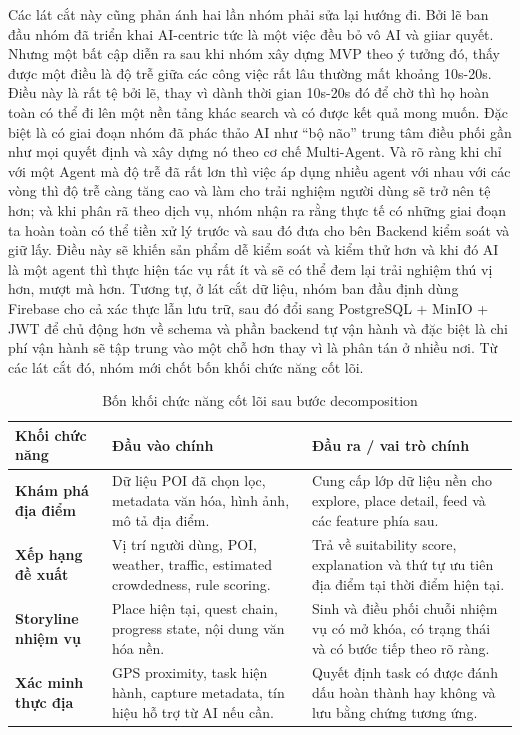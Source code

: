 Các lát cắt này cũng phản ánh hai lần nhóm phải sửa lại hướng đi. Bởi lẽ ban đầu nhóm đã triển khai
AI-centric tức là một việc đều bỏ vô AI và giiar quyết. Nhưng một bất cập diễn ra sau khi nhóm xây dựng MVP theo ý tưởng đó, thấy được một điều 
là độ trễ giữa các công việc rất lâu thường mất khoảng 10s-20s. Điều này là rất tệ bởi lẽ, thay vì dành thời gian 10s-20s đó để chờ
thì họ hoàn toàn có thể đi lên một nền tảng khác search và có được kết quả mong muốn. Đặc biệt là có giai đoạn nhóm đã 
phác thảo AI như ``bộ não'' trung tâm điều phối gần như mọi
quyết định và xây dựng nó theo cơ chế Multi-Agent. Và rõ ràng khi chỉ với một Agent mà độ trễ đã rất lơn
thì việc áp dụng nhiều agent với nhau với các vòng thì độ trễ càng tăng cao và làm cho trải nghiệm
người dùng sẽ trở nên tệ hơn; và khi phân rã theo dịch vụ, nhóm nhận ra rằng thực tế có những giai đoạn ta hoàn toàn có 
thể tiền xử lý trước và sau đó đưa cho bên Backend kiểm soát và giữ lấy. Điều này sẽ khiến
sản phẩm dễ kiểm soát và kiểm thử hơn và khi đó AI là một agent thì thực hiện tác vụ rất ít và sẽ có thể đem lại
trải nghiệm thú vị hơn, mượt mà hơn. Tương tự, ở lát cắt dữ liệu,
nhóm ban đầu định dùng Firebase cho cả xác thực lẫn lưu trữ, sau đó đổi
sang PostgreSQL + MinIO + JWT để chủ động hơn về schema và phần backend
tự vận hành và đặc biệt là chi phí vận hành sẽ tập trung vào một chỗ hơn thay vì 
là phân tán ở nhiều nơi. Từ các lát cắt đó, nhóm mới chốt bốn khối chức năng cốt lõi.

\begin{table}[H]
\centering
\caption{Bốn khối chức năng cốt lõi sau bước decomposition}
\label{tab:decomposition_core_blocks}
\begin{tabularx}{\textwidth}{>{\raggedright\arraybackslash}p{3.0cm} X X}
\toprule
\textbf{Khối chức năng} & \textbf{Đầu vào chính} & \textbf{Đầu ra / vai trò chính} \\
\midrule
\textbf{Khám phá địa điểm} & Dữ liệu POI đã chọn lọc, metadata văn hóa, hình ảnh, mô tả địa điểm. & Cung cấp lớp dữ liệu nền cho explore, place detail, feed và các feature phía sau. \\
\textbf{Xếp hạng đề xuất} & Vị trí người dùng, POI, weather, traffic, estimated crowdedness, rule scoring. & Trả về suitability score, explanation và thứ tự ưu tiên địa điểm tại thời điểm hiện tại. \\
\textbf{Storyline nhiệm vụ} & Place hiện tại, quest chain, progress state, nội dung văn hóa nền. & Sinh và điều phối chuỗi nhiệm vụ có mở khóa, có trạng thái và có bước tiếp theo rõ ràng. \\
\textbf{Xác minh thực địa} & GPS proximity, task hiện hành, capture metadata, tín hiệu hỗ trợ từ AI nếu cần. & Quyết định task có được đánh dấu hoàn thành hay không và lưu bằng chứng tương ứng. \\
\bottomrule
\end{tabularx}
\end{table}

